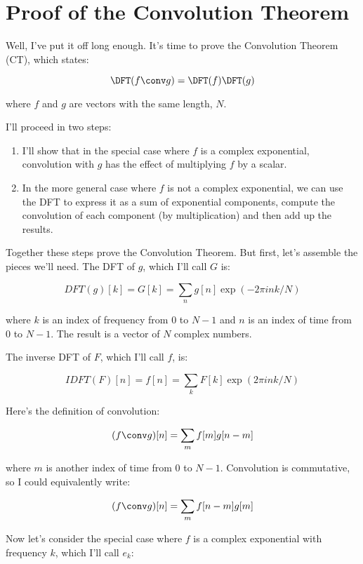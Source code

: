 \documentclass[12pt]{book} \usepackage[width=5.5in,height=8.5in, hmarginratio=3:2,vmarginratio=1:1]{geometry}
\begin{document}
\section{Proof of the Convolution Theorem} 

Well, I've put it off long enough. It's time to prove the Convolution Theorem (CT), which states: 

\[ \DFT(f \conv g) = \DFT(f) \DFT(g) \] 

where $f$ and $g$ are vectors with the same length, $N$. 

I'll proceed in two steps: 

\begin{enumerate} 

\item I'll show that in the special case where $f$ is a complex exponential, convolution with $g$ has the effect of multiplying $f$ by a scalar. 

\item In the more general case where $f$ is not a complex exponential, we can use the DFT to express it as a sum of exponential components, compute the convolution of each component (by multiplication) and then add up the results. 

\end{enumerate} 

Together these steps prove the Convolution Theorem. But first, let's assemble the pieces we'll need. The DFT of $g$, which I'll call $G$ is: 

%
\[ DFT(g)[k] = G[k] = \sum_n g[n] \exp(-2 \pi i n k / N) \] 

%
where $k$ is an index of frequency from 0 to $N-1$ and $n$ is an index of time from 0 to $N-1$. The result is a vector of $N$ complex numbers. 

The inverse DFT of $F$, which I'll call $f$, is: 

%
\[ IDFT(F)[n] = f[n] = \sum_k F[k] \exp(2 \pi i n k / N) \] 

%
Here's the definition of convolution: 

%
\[ (f \conv g)[n] = \sum_m f[m] g[n-m] \] 

%
where $m$ is another index of time from 0 to $N-1$. Convolution is commutative, so I could equivalently write: 

%
\[ (f \conv g)[n] = \sum_m f[n-m] g[m] \] 

%
Now let's consider the special case where $f$ is a complex exponential with frequency $k$, which I'll call $e_k$: 
\end{document}
